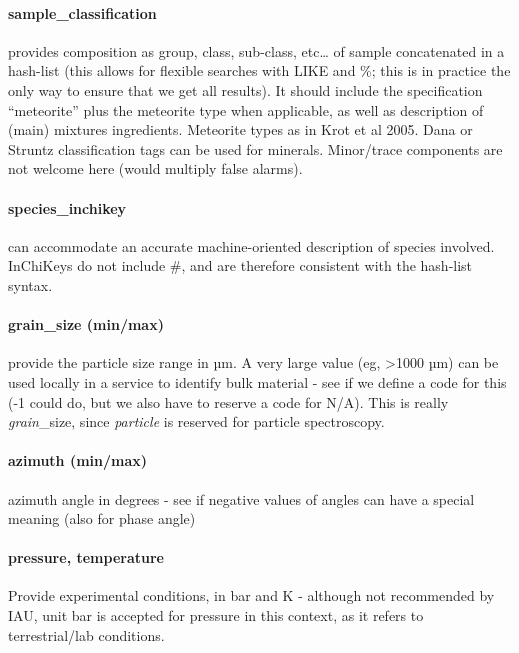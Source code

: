 \documentclass[11pt,a4paper]{ivoa}
\begin{document}
\paragraph{sample\_classification}

provides composition as group, class, sub-class, etc… of sample concatenated in a hash-list (this allows for flexible searches with LIKE and \%; this is in practice the only way to ensure that we get all results). It should include the specification ``meteorite'' plus the meteorite type when applicable, as well as description of (main) mixtures ingredients. Meteorite types as in Krot et al 2005. Dana or Struntz classification tags can be used for minerals. Minor/trace components are not welcome here (would multiply false alarms).

\paragraph{\textbf{species\_inchikey} }

can accommodate an accurate machine-oriented description of species involved. InChiKeys do not include \#, and are therefore consistent with the hash-list syntax.

\paragraph{grain\_size (min/max)}

provide the particle size range in µm. A very large value (eg, >1000 µm) can be used locally in a service to identify bulk material - see if we define a code for this (-1 could do, but we also have to reserve a code for N/A). This is really \emph{grain}\_size, since \emph{particle} is reserved for particle spectroscopy.\\

\paragraph{azimuth (min/max)}

azimuth angle in degrees - see if negative values of angles can have a special meaning (also for phase angle)

\paragraph{pressure, temperature}

Provide experimental conditions, in bar and K - although not recommended by IAU, unit bar is accepted for pressure in this context, as it refers to terrestrial/lab conditions.
\end{document}
